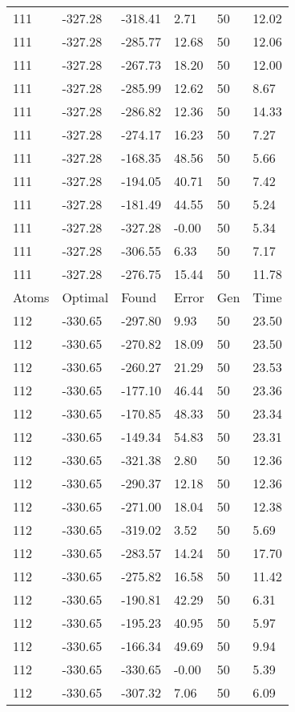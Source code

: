 \documentclass{report}
\begin{document}
\begin{appendix}
\begin{longtable}{llllll}
111 & -327.28 & -318.41 & 2.71 & 50 & 12.02 \\
111 & -327.28 & -285.77 & 12.68 & 50 & 12.06 \\
111 & -327.28 & -267.73 & 18.20 & 50 & 12.00 \\
111 & -327.28 & -285.99 & 12.62 & 50 & 8.67 \\
111 & -327.28 & -286.82 & 12.36 & 50 & 14.33 \\
111 & -327.28 & -274.17 & 16.23 & 50 & 7.27 \\
111 & -327.28 & -168.35 & 48.56 & 50 & 5.66 \\
111 & -327.28 & -194.05 & 40.71 & 50 & 7.42 \\
111 & -327.28 & -181.49 & 44.55 & 50 & 5.24 \\
111 & -327.28 & -327.28 & -0.00 & 50 & 5.34 \\
111 & -327.28 & -306.55 & 6.33 & 50 & 7.17 \\
111 & -327.28 & -276.75 & 15.44 & 50 & 11.78 \\
Atoms & Optimal & Found & Error & Gen & Time \\
112 & -330.65 & -297.80 & 9.93 & 50 & 23.50 \\
112 & -330.65 & -270.82 & 18.09 & 50 & 23.50 \\
112 & -330.65 & -260.27 & 21.29 & 50 & 23.53 \\
112 & -330.65 & -177.10 & 46.44 & 50 & 23.36 \\
112 & -330.65 & -170.85 & 48.33 & 50 & 23.34 \\
112 & -330.65 & -149.34 & 54.83 & 50 & 23.31 \\
112 & -330.65 & -321.38 & 2.80 & 50 & 12.36 \\
112 & -330.65 & -290.37 & 12.18 & 50 & 12.36 \\
112 & -330.65 & -271.00 & 18.04 & 50 & 12.38 \\
112 & -330.65 & -319.02 & 3.52 & 50 & 5.69 \\
112 & -330.65 & -283.57 & 14.24 & 50 & 17.70 \\
112 & -330.65 & -275.82 & 16.58 & 50 & 11.42 \\
112 & -330.65 & -190.81 & 42.29 & 50 & 6.31 \\
112 & -330.65 & -195.23 & 40.95 & 50 & 5.97 \\
112 & -330.65 & -166.34 & 49.69 & 50 & 9.94 \\
112 & -330.65 & -330.65 & -0.00 & 50 & 5.39 \\
112 & -330.65 & -307.32 & 7.06 & 50 & 6.09 \\

\end{longtable}
\end{appendix}
\end{document}
